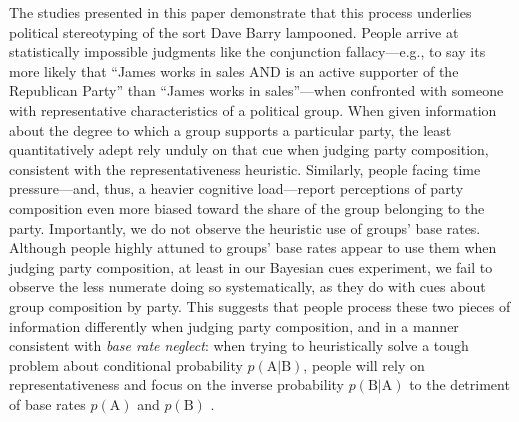 \documentclass[12pt, letterpaper]{article}
\begin{document}
The studies presented in this paper demonstrate that this process underlies political stereotyping of the sort Dave Barry lampooned. People arrive at statistically impossible judgments like the conjunction fallacy---e.g., to say its more likely that ``James works in sales AND is an active supporter of the Republican Party'' than ``James works in sales''---when confronted with someone with representative characteristics of a political group. When given information about the degree to which a group supports a particular party, the least quantitatively adept rely unduly on that cue when judging party composition, consistent with the representativeness heuristic. Similarly, people facing time pressure---and, thus, a heavier cognitive load---report perceptions of party composition even more biased toward the share of the group belonging to the party. Importantly, we do not observe the heuristic use of groups' base rates. Although people highly attuned to groups' base rates appear to use them when judging party composition, at least in our Bayesian cues experiment, we fail to observe the less numerate doing so systematically, as they do with cues about group composition by party. This suggests that people process these two pieces of information differently when judging party composition, and in a manner consistent with \emph{base rate neglect}: when trying to heuristically solve a tough problem about conditional probability $p(\text{A|B})$, people will rely on representativeness and focus on the inverse probability $p(\text{B|A})$ to the detriment of base rates $p(\text{A})$ and $p(\text{B})$ \citep{KahnemanFrederick2002}.
\end{document}
